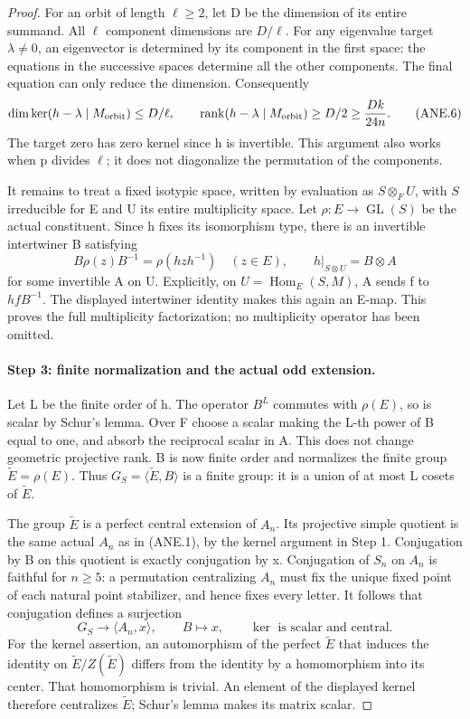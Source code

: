\begin{proof}
For an orbit of length \(\ell\ge2\), let D be the dimension
of its entire summand.  All \(\ell\) component dimensions are
\(D/\ell\).  For any eigenvalue target \(\lambda\ne0\),
an eigenvector is determined by its component in the first space:
the equations in the successive spaces determine all the other
components.  The final equation can only reduce the dimension.
Consequently
\[
 \dim\ker(h-\lambda\mid M_{\rm orbit})\le D/\ell,
 \qquad
 \operatorname{rank}(h-\lambda\mid M_{\rm orbit})
       \ge D/2\ge\frac{Dk}{24n}.
 \tag{ANE.6}
\]
The target zero has zero kernel since h is invertible.  This
argument also works when p divides \(\ell\); it does not
diagonalize the permutation of the components.

It remains to treat a fixed isotypic space, written by evaluation
as \(S\otimes_F U\), with \(S\) irreducible for E and U its
entire multiplicity space.  Let \(\rho:E\to\operatorname{GL}(S)\)
be the actual constituent.  Since h fixes its isomorphism type,
there is an invertible intertwiner B satisfying
\[
 B\rho(z)B^{-1}=\rho(hzh^{-1})\quad(z\in E),\qquad
 h\big|_{S\otimes U}=B\otimes A
 \tag{ANE.7}
\]
for some invertible A on U.  Explicitly, on
\(U=\operatorname{Hom}_E(S,M)\), A sends f to \(h f B^{-1}\).
The displayed intertwiner identity makes this again an E-map.
This proves the full multiplicity factorization; no multiplicity
operator has been omitted.

\paragraph{Step 3: finite normalization and the actual odd extension.}
Let L be the finite order of h.  The operator \(B^L\) commutes
with \(\rho(E)\), so is scalar by Schur's lemma.  Over F choose
a scalar making the L-th power of B equal to one, and absorb the
reciprocal scalar in A.  This does not change geometric projective
rank.  B is now finite order and normalizes the finite group
\(\widetilde E=\rho(E)\).  Thus
\(G_S=\langle\widetilde E,B\rangle\) is a finite group: it is
a union of at most L cosets of \(\widetilde E\).

The group \(\widetilde E\) is a perfect central extension of
\(A_n\).  Its projective simple quotient is the same actual
\(A_n\) as in (ANE.1), by the kernel argument in Step 1.
Conjugation by B on this quotient is exactly conjugation by x.
Conjugation of \(S_n\) on \(A_n\) is faithful for \(n\ge5\):
a permutation centralizing \(A_n\) must fix the unique fixed
point of each natural point stabilizer, and hence fixes every
letter.  It follows that conjugation defines a surjection
\[
 G_S\longrightarrow\langle A_n,x\rangle,
 \qquad B\longmapsto x,
 \qquad\ker\text{ is scalar and central}.
 \tag{ANE.8}
\]
For the kernel assertion, an automorphism of the perfect
\(\widetilde E\) that induces the identity on
\(\widetilde E/Z(\widetilde E)\) differs from the identity by
a homomorphism into its center.  That homomorphism is trivial.
An element of the displayed kernel therefore centralizes
\(\widetilde E\); Schur's lemma makes its matrix scalar.


\end{proof}
